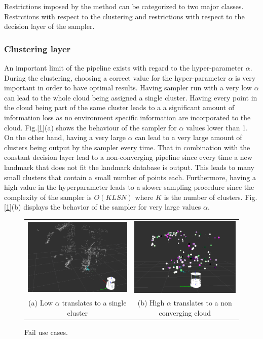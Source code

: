 \documentclass[twoside,hidelinks]{article}
\begin{document}
	Restrictions imposed by the method can be categorized to two major classes. Restrctions with respect to the clustering and restrictions with respect to the decision layer of the sampler.


\subsubsection{Clustering layer}


An important limit of the pipeline exists with regard to the hyper-parameter $\alpha$. During the clustering, choosing a correct value for the hyper-parameter $\alpha$ is very important in order to have optimal results. Having sampler run with a very low $\alpha$ can lead to the whole cloud being assigned a single cluster. Having every point in the cloud being part of the same cluster leads to a a significant amount of information loss as no environment specific information are incorporated to the cloud. Fig.[\ref{pip:limits}](a) shows the behaviour of the sampler for $\alpha$ values lower than 1. On the other hand, having a very large $\alpha$ can lead to a very large amount of clusters being output by the sampler every time. That in combination with the constant decision layer lead to a non-converging pipeline since every time a new landmark that does not fit the landmark database is output. This leads to many small clusters that contain a small number of points each. Furthermore, having a high value in the hyperparameter leads to a slower sampling procedure since the complexity of the sampler is $O(KLSN)$ where $K$ is the number of clusters. Fig.[\ref{pip:limits}](b) displays the behavior of the sampler for very large values $\alpha$.


\begin{figure}
\begin{tabular}{cc}
    \includegraphics[width=.5\textwidth]{singlecluster} &  \includegraphics[width=.5\textwidth]{onlyclusters2} \\
  (a) Low $\alpha$ translates to a single cluster  & (b) High $\alpha$ translates to a non converging cloud \\[6pt]
\end{tabular}
\caption{Fail use cases.}
  \label{pip:limits}
\end{figure}
\end{document}
